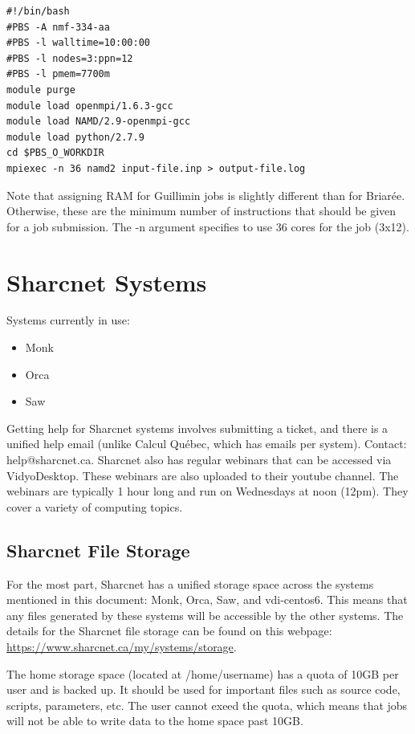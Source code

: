 \documentclass[12pt]{article}
\begin{document}
\begin{lstlisting}
#!/bin/bash
#PBS -A nmf-334-aa
#PBS -l walltime=10:00:00
#PBS -l nodes=3:ppn=12
#PBS -l pmem=7700m
module purge
module load openmpi/1.6.3-gcc
module load NAMD/2.9-openmpi-gcc
module load python/2.7.9
cd $PBS_O_WORKDIR
mpiexec -n 36 namd2 input-file.inp > output-file.log
\end{lstlisting}

\quad Note that assigning RAM for Guillimin jobs is slightly different than for Briar\'{e}e. Otherwise, these are the minimum number of instructions that should be given for a job submission. The -n argument specifies to use 36 cores for the job (3x12).

\section{Sharcnet Systems}\label{Sharc}

\quad Systems currently in use:
\begin{itemize}
\item Monk
\item Orca
\item Saw
\end{itemize}

\quad Getting help for Sharcnet systems involves submitting a ticket, and there is a unified help email (unlike Calcul Qu\'{e}bec, which has emails per system). Contact: help@sharcnet.ca. Sharcnet also has regular webinars that can be accessed via VidyoDesktop. These webinars are also uploaded to their youtube channel. The webinars are typically 1 hour long and run on Wednesdays at noon (12pm). They cover a variety of computing topics.

\subsection{Sharcnet File Storage}
\quad For the most part, Sharcnet has a unified storage space across the systems mentioned in this document: Monk, Orca, Saw, and vdi-centos6. This means that any files generated by these systems will be accessible by the other systems. The details for the Sharcnet file storage can be found on this webpage: \url{https://www.sharcnet.ca/my/systems/storage}. 

\quad The home storage space (located at /home/username) has a quota of 10GB per user and is backed up. It should be used for important files such as source code, scripts, parameters, etc. The user cannot exeed the quota, which means that jobs will not be able to write data to the home space past 10GB. 
\end{document}

